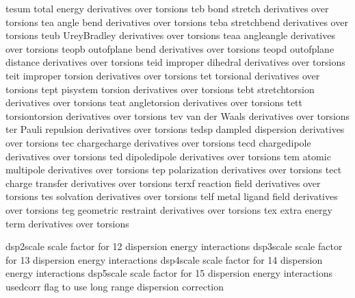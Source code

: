 \documentclass[letterpaper,11pt,english]{sphinxmanual}
\begin{document}

\begin{sphinxVerbatim}[commandchars=\\\{\}]
tesum           total energy derivatives over torsions
teb             bond stretch derivatives over torsions
tea             angle bend derivatives over torsions
teba            stretch\PYGZhy{}bend derivatives over torsions
teub            Urey\PYGZhy{}Bradley derivatives over torsions
teaa            angle\PYGZhy{}angle derivatives over torsions
teopb           out\PYGZhy{}of\PYGZhy{}plane bend derivatives over torsions
teopd           out\PYGZhy{}of\PYGZhy{}plane distance derivatives over torsions
teid            improper dihedral derivatives over torsions
teit            improper torsion derivatives over torsions
tet             torsional derivatives over torsions
tept            pi\PYGZhy{}system torsion derivatives over torsions
tebt            stretch\PYGZhy{}torsion derivatives over torsions
teat            angle\PYGZhy{}torsion derivatives over torsions
tett            torsion\PYGZhy{}torsion derivatives over torsions
tev             van der Waals derivatives over torsions
ter             Pauli repulsion derivatives over torsions
tedsp           dampled dispersion derivatives over torsions
tec             charge\PYGZhy{}charge derivatives over torsions
tecd            charge\PYGZhy{}dipole derivatives over torsions
ted             dipole\PYGZhy{}dipole derivatives over torsions
tem             atomic multipole derivatives over torsions
tep             polarization derivatives over torsions
tect            charge transfer derivatives over torsions
terxf           reaction field derivatives over torsions
tes             solvation derivatives over torsions
telf            metal ligand field derivatives over torsions
teg             geometric restraint derivatives over torsions
tex             extra energy term derivatives over torsions
\end{sphinxVerbatim}


\begin{sphinxVerbatim}[commandchars=\\\{\}]
dsp2scale       scale factor for 1\PYGZhy{}2 dispersion energy interactions
dsp3scale       scale factor for 1\PYGZhy{}3 dispersion energy interactions
dsp4scale       scale factor for 1\PYGZhy{}4 dispersion energy interactions
dsp5scale       scale factor for 1\PYGZhy{}5 dispersion energy interactions
use\PYGZus{}dcorr       flag to use long range dispersion correction
\end{sphinxVerbatim}
\end{document}
